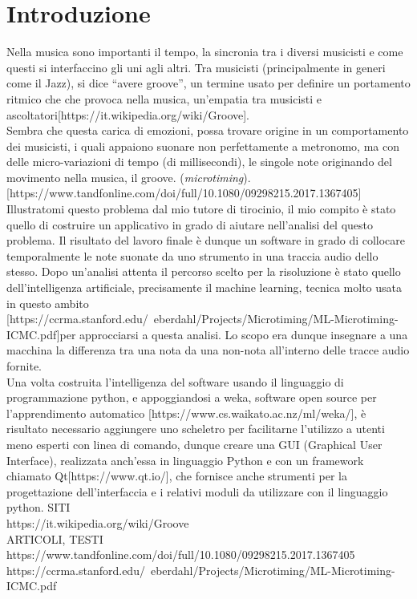 \chapter*{Introduzione}
\label{cap:introduzione}
\rhead{\thepage}

\pagestyle{fancy}
\fancyhf{}
\renewcommand{\headrulewidth}{2pt}
\fancyhead[EL]{\textbf{\textsf{\nouppercase\thepage}}}
\fancyhead[ER]{\textbf{\textsf{\nouppercase\leftmark}}}
\fancyhead[OR]{\textbf{\textsf{\nouppercase\thepage}}}
\fancyhead[OL]{\textbf{\textsf{\nouppercase {\rightmark}}}}

\thispagestyle{empty}

Nella musica sono importanti il tempo, la sincronia tra i diversi musicisti e come questi si interfaccino gli uni agli altri. Tra musicisti (principalmente in generi come il Jazz), si dice ``avere groove'', un termine usato per definire un portamento ritmico che che provoca nella musica, un'empatia tra musicisti e ascoltatori[https://it.wikipedia.org/wiki/Groove].\\
Sembra che questa carica di emozioni, possa trovare origine in un comportamento dei musicisti, i quali appaiono suonare non perfettamente a metronomo, ma con delle micro-variazioni di tempo (di millisecondi), le singole note originando del movimento nella musica, il groove. (\emph{microtiming}).[https://www.tandfonline.com/doi/full/10.1080/09298215.2017.1367405]\\
Illustratomi questo problema dal mio tutore di tirocinio, il mio compito è stato quello di costruire un applicativo in grado di aiutare nell'analisi del questo problema. Il risultato del lavoro finale è dunque un software in grado di collocare temporalmente le note suonate da uno strumento in una traccia audio dello stesso. Dopo un'analisi attenta il percorso scelto per la risoluzione è stato quello dell'intelligenza artificiale, precisamente il machine learning, tecnica molto usata in questo ambito [https://ccrma.stanford.edu/~eberdahl/Projects/Microtiming/ML-Microtiming-ICMC.pdf]per approcciarsi a questa analisi. Lo scopo era dunque insegnare a una macchina la differenza tra una nota da una non-nota all'interno delle tracce audio fornite.\\
Una volta costruita l'intelligenza del software usando il linguaggio di programmazione python, e appoggiandosi a weka, software open source per l'apprendimento automatico [https://www.cs.waikato.ac.nz/ml/weka/], è risultato necessario aggiungere uno scheletro per facilitarne l'utilizzo a utenti meno esperti con linea di comando, dunque creare una GUI (Graphical User Interface), realizzata anch'essa in linguaggio Python e con un framework chiamato Qt[https://www.qt.io/], che fornisce anche strumenti per la progettazione dell'interfaccia e i relativi moduli da utilizzare con il linguaggio python.
SITI\\
https://it.wikipedia.org/wiki/Groove\\

ARTICOLI, TESTI\\
https://www.tandfonline.com/doi/full/10.1080/09298215.2017.1367405\\
https://ccrma.stanford.edu/~eberdahl/Projects/Microtiming/ML-Microtiming-ICMC.pdf\\